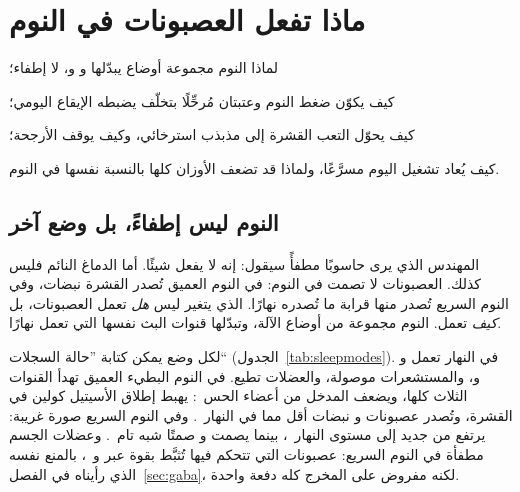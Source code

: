 \chapter{ماذا تفعل العصبونات في النوم}
\label{sec:sleep}
\begin{chaptergoals}
\item لماذا النوم مجموعة أوضاع يبدّلها  و و، لا إطفاء؛
\item كيف يكوّن ضغط النوم وعتبتان مُرحِّلًا بتخلّف يضبطه الإيقاع اليومي؛
\item كيف يحوّل التعب القشرة إلى مذبذب استرخائي، وكيف يوقف  الأرجحة؛
\item كيف يُعاد تشغيل اليوم مسرَّعًا، ولماذا قد تضعف الأوزان كلها بالنسبة نفسها في النوم.
\end{chaptergoals}

\section{النوم ليس إطفاءً، بل وضع آخر}

المهندس الذي يرى حاسوبًا مطفأً سيقول: إنه لا يفعل شيئًا. أما الدماغ النائم فليس كذلك. العصبونات لا تصمت في النوم: في النوم العميق تُصدر القشرة نبضات، وفي النوم السريع تُصدر منها قرابة ما تُصدره نهارًا. الذي يتغير ليس \emph{هل} تعمل العصبونات، بل \emph{كيف} تعمل. النوم مجموعة من أوضاع الآلة، وتبدّلها قنوات البث نفسها التي تعمل نهارًا.

لكل وضع يمكن كتابة ”حالة السجلات“ (الجدول~\ref{tab:sleepmodes}). في النهار تعمل  و و، والمستشعرات موصولة، والعضلات تطيع. في النوم البطيء العميق تهدأ القنوات الثلاث كلها، ويضعف المدخل من أعضاء الحس~\cite{Hasselmo1999}: يهبط إطلاق الأسيتيل كولين في القشرة، وتُصدر عصبونات  و نبضات أقل مما في النهار~\cite{Marrosu1995,AstonJonesBloom1981,McGintyHarper1976}. وفي النوم السريع صورة غريبة: يرتفع  من جديد إلى مستوى النهار~\cite{Marrosu1995}، بينما يصمت  و صمتًا شبه تام~\cite{AstonJonesBloom1981,McGintyHarper1976,JacobsAzmitia1992}. وعضلات الجسم مطفأة في النوم السريع: عصبونات  التي تتحكم فيها تُثبَّط بقوة عبر  و~\cite{BrooksPeever2012}، بالمنع نفسه الذي رأيناه في الفصل~\ref{sec:gaba}، لكنه مفروض على المخرج كله دفعة واحدة.

